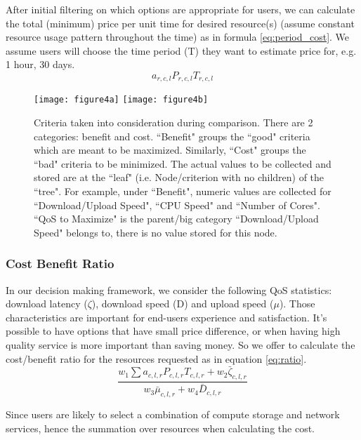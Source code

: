 \documentclass[journal]{IEEEtran}
\begin{document}
After initial filtering on which options are appropriate for users, we can calculate the total (minimum) price per unit time for desired resource(s) (assume constant resource usage pattern throughout the time) as in formula \ref{eq:period_cost}. We assume users will choose the time period (T) they want to estimate price for, e.g. 1 hour, 30 days.
\begin{equation}\label{eq:period_cost}
{a_{r,c,l}}{P_{r,c,l}}{T_{r,c,l}}
\end{equation}

\begin{figure}[!h]
 \centering
 \texttt{[image: figure4a]}
  \texttt{[image: figure4b]}
 \caption{ Criteria taken into consideration during comparison. There are 2 categories: benefit and cost. ``Benefit" groups the ``good" criteria which are meant to be maximized. Similarly, ``Cost" groups the ``bad" criteria to be minimized. The actual values to be collected and stored are at the ``leaf" (i.e. Node/criterion with no children) of the ``tree". For example, under ``Benefit", numeric values are collected for ``Download/Upload Speed", ``CPU Speed" and ``Number of Cores". ``QoS to Maximize" is the parent/big category ``Download/Upload Speed" belongs to, there is no value stored for this node.}
\label{fig4}
\end{figure}

\subsubsection{Cost Benefit Ratio}
\label{subsec:cost_benefit_ratio}

In our decision making framework, we consider the following QoS statistics: download latency ($\zeta$), download speed (D) and upload speed ($\mu$). Those characteristics are important for end-users experience and satisfaction. It's possible to have options that have small price difference, or when having high quality service is more important than saving money. So we offer to calculate the cost/benefit ratio for the resources requested as in equation \ref{eq:ratio}.
\begin{equation}\label{eq:ratio}
\frac{ w_1 \sum { a_{c,l,r} P_{c,l,r} T_{c,l,r} } + w_2 \bar\zeta_{c,l,r} } {w_3 \bar\mu_{c,l,r} + w_4\bar D_{c,l,r}}
\end{equation}

Since users are likely to select a combination of compute storage and network services, hence the summation over resources when calculating the cost.
\end{document}
